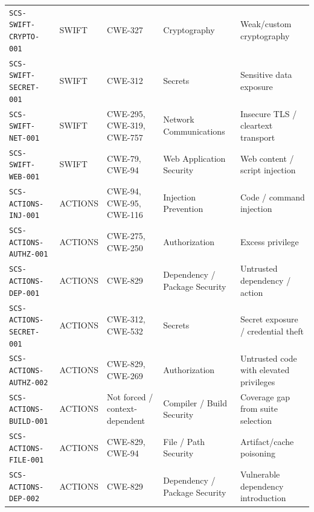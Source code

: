 \documentclass[10pt,letterpaper]{article}
\newcommand{\code}[1]{\begingroup\small\ttfamily\def\UrlFont{\ttfamily}\nolinkurl{#1}\endgroup}
\begin{document}
\begin{landscape}
\begin{longtable}{@{}P{1.3in}P{0.7in}P{1.4in}P{1.8in}P{3.8in}@{}}
\code{SCS-SWIFT-CRYPTO-001} & SWIFT & CWE-327 & Cryptography & Weak/custom cryptography\\
\code{SCS-SWIFT-SECRET-001} & SWIFT & CWE-312 & Secrets & Sensitive data exposure\\
\code{SCS-SWIFT-NET-001} & SWIFT & CWE-295, CWE-319, CWE-757 & Network Communications & Insecure TLS / cleartext transport\\
\code{SCS-SWIFT-WEB-001} & SWIFT & CWE-79, CWE-94 & Web Application Security & Web content / script injection\\
\code{SCS-ACTIONS-INJ-001} & ACTIONS & CWE-94, CWE-95, CWE-116 & Injection Prevention & Code / command injection\\
\code{SCS-ACTIONS-AUTHZ-001} & ACTIONS & CWE-275, CWE-250 & Authorization & Excess privilege\\
\code{SCS-ACTIONS-DEP-001} & ACTIONS & CWE-829 & Dependency / Package Security & Untrusted dependency / action\\
\code{SCS-ACTIONS-SECRET-001} & ACTIONS & CWE-312, CWE-532 & Secrets & Secret exposure / credential theft\\
\code{SCS-ACTIONS-AUTHZ-002} & ACTIONS & CWE-829, CWE-269 & Authorization & Untrusted code with elevated privileges\\
\code{SCS-ACTIONS-BUILD-001} & ACTIONS & Not forced / context-dependent & Compiler / Build Security & Coverage gap from suite selection\\
\code{SCS-ACTIONS-FILE-001} & ACTIONS & CWE-829, CWE-94 & File / Path Security & Artifact/cache poisoning\\
\code{SCS-ACTIONS-DEP-002} & ACTIONS & CWE-829 & Dependency / Package Security & Vulnerable dependency introduction\\
\bottomrule
\end{longtable}
\normalsize
\end{landscape}
\end{document}
